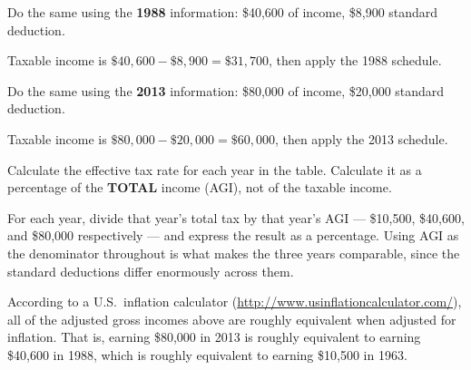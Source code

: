 \documentclass[12pt]{ximera}
\begin{document}
\begin{problem}
Do the same using the \textbf{1988} information: \$40,600 of income, \$8,900 standard
deduction.

\showwork

\begin{freeResponse}
\end{freeResponse}

\begin{solution}
Taxable income is $\$40{,}600 - \$8{,}900 = \$31{,}700$, then apply the 1988 schedule.
\end{solution}
\end{problem}

\begin{problem}
Do the same using the \textbf{2013} information: \$80,000 of income, \$20,000 standard
deduction.

\showwork

\begin{freeResponse}
\end{freeResponse}

\begin{solution}
Taxable income is $\$80{,}000 - \$20{,}000 = \$60{,}000$, then apply the 2013 schedule.
\end{solution}
\end{problem}

\begin{problem}
Calculate the effective tax rate for each year in the table. Calculate it as a
percentage of the \textbf{TOTAL} income (AGI), not of the taxable income.

\begin{freeResponse}
\end{freeResponse}

\begin{solution}
For each year, divide that year's total tax by that year's AGI --- \$10,500, \$40,600,
and \$80,000 respectively --- and express the result as a percentage. Using AGI as the
denominator throughout is what makes the three years comparable, since the standard
deductions differ enormously across them.
\end{solution}
\end{problem}

According to a U.S.\ inflation calculator
(\url{http://www.usinflationcalculator.com/}), all of the adjusted gross incomes above
are roughly equivalent when adjusted for inflation. That is, earning \$80,000 in 2013 is
roughly equivalent to earning \$40,600 in 1988, which is roughly equivalent to earning
\$10,500 in 1963.
\end{document}
